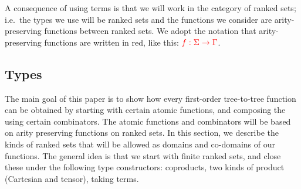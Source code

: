 A consequence of using terms is that we will work in the category of ranked sets; i.e.~the types we use will be ranked sets and the functions we consider are arity-preserving functions between ranked sets. We adopt the notation that arity-preserving functions are written in red, like this: ${\color{red}{f : \Sigma \to \Gamma}}$. 


\subsection{Types}
The  main goal of this paper is to  show how every first-order tree-to-tree function can be obtained by starting with certain atomic functions, and composing the using certain combinators. The atomic functions and combinators will be based on arity preserving functions on ranked sets. In this section, we describe the kinds of ranked sets that will be allowed as domains and co-domains of our functions. The general idea is that we start with finite ranked sets, and close these under the following type constructors: coproducts, two kinds of product (Cartesian and tensor), taking terms.


